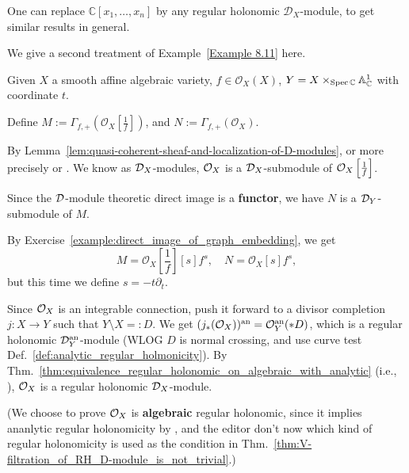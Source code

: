 \begin{remark}
    One can replace $\mathbb{C}[x_1, \ldots, x_n]$ by any regular holonomic $\mathcal{D}_X$-module, to get similar results in general.
\end{remark}

\begin{remark}\label{remark:second_treatment_of_example_8.11}
    We give a second treatment of Example~\ref{Example 8.11} here.

    Given $X$ a smooth affine algebraic variety, $f \in \mathcal{O}_X(X)$, $Y = X \times_{\operatorname{Spec}{\mathbb{C}}} \mathbb{A}^1_{\mathbb{C}}$ with coordinate $t$.

    Define $M:=\Gamma_{f,+}\left(\mathcal{O}_X\left[\frac{1}{f}\right]\right)$, and $N:=\Gamma_{f,+}(\mathcal{O}_X)$.

    By Lemma~\ref{lem:quasi-coherent-sheaf-and-localization-of-D-modules}, or more precisely \cite[\href{https://stacks.math.columbia.edu/tag/0G36}{Tag 0G36}]{stacks-project} or \cite[Lem.~4.1., Lem.~4.2.]{chen2024dmodules}.
    We know as $\mathcal{D}_X$-modules, $\mathcal{O}_X$ is a $\mathcal{D}_X$-submodule of $\mathcal{O}_X\left[\frac{1}{f}\right]$.

    Since the $\mathcal{D}$-module theoretic direct image is a \textbf{functor}, we have $N$ is a $\mathcal{D}_Y$-submodule of $M$.

    By Exercise~\ref{example:direct_image_of_graph_embedding}, we get
    \[
        M = \mathcal{O}_X\left[\frac{1}{f}\right][s]f^s, \quad N = \mathcal{O}_X[s]f^s,
    \]
    but this time we define $s = -t\partial_t$.

    \bigskip

    Since $\mathcal{O}_X$ is an integrable connection, push it forward to a divisor completion $j:X\to Y$ such that $Y\setminus X =: D$.
    We get $(j_*(\mathcal{O}_X))^{\mathrm{an}} = \mathcal{O}_Y^{\mathrm{an}}(\ast D)$, which is a regular holonomic $\mathcal{D}^{\mathrm{an}}_Y$-module (WLOG $D$ is normal crossing, and use curve test Def.~\ref{def:analytic_regular_holmonicity}).
    By Thm.~\ref{thm:equivalence_regular_holonomic_on_algebraic_with_analytic} (i.e., \cite[Thm.~6.1.12]{hotta2008d}), $\mathcal{O}_X$ is a regular holonomic $\mathcal{D}_X$-module.
    
    (We choose to prove $\mathcal{O}_X$ is \textbf{algebraic} regular holonomic, 
    since it implies ananlytic regular holonomicity by \cite[Thm~6.1.12]{hotta2008d}, 
    and the editor don't now which kind of regular holonomicity is used as the condition in Thm.~\ref{thm:V-filtration_of_RH_D-module_is_not_trivial}.)

    \bigskip


\end{remark}
